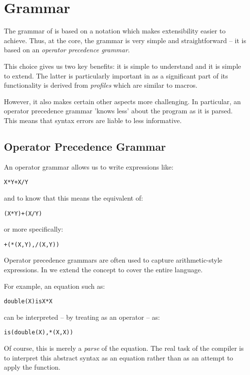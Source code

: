 \chapter{Grammar}
\label{Grammar}
The grammar of \Sr is based on a notation which makes extensibility easier to achieve. Thus, at the core, the grammar is very simple and straightforward -- it is based on an \emph{operator precedence grammar}.
\begin{aside}
This choice gives us two key benefits: it is simple to understand and it is simple to extend. The latter is particularly important in \Sr as a significant part of its functionality is derived from \emph{profiles} which are similar to macros.

However, it also makes certain other aspects more challenging. In particular, an operator precedence grammar 'knows less' about the program as it is parsed. This means that syntax errors are liable to less informative.
\end{aside}

\section{Operator Precedence Grammar}
An operator grammar allows us to write expressions like:
\begin{alltt}
X * Y + X / Y
\end{alltt}
and to know that this means the equivalent of:
\begin{alltt}
(X * Y) + (X / Y)
\end{alltt}
or more specifically:
\begin{alltt}
+(*(X, Y), /(X, Y))
\end{alltt}
Operator precedence grammars are often used to capture arithm\-etic-style expressions. In \Sr we extend the concept to cover the entire language.

For example, an equation such as:
\begin{alltt}
double(X) is X*X
\end{alltt}
can be interpreted -- by treating  as an operator -- as:
\begin{alltt}
is(double(X),*(X,X))
\end{alltt}
Of course, this is merely a \emph{parse} of the equation. The real task of the compiler is to interpret this abstract syntax as an equation rather than as an attempt to apply the  function.


